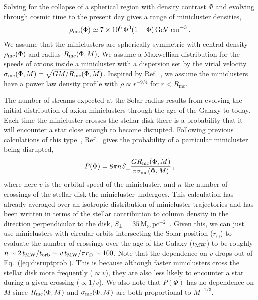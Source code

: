 Solving for the collapse of a spherical region with density contrast $\Phi$ and evolving through cosmic time to the present day gives a range of minicluster densities, 
\begin{equation}
\rho_{\rm mc}(\Phi) \simeq 7 \times 10^6 \, \Phi^3 (1+\Phi) \, \textrm{GeV cm}^{-3} \, .
\end{equation}
We assume that the miniclusters are spherically symmetric with central density $\rho_{\rm mc}(\Phi)$ and radius $R_{\rm mc}(\Phi,M)$. We assume a Maxwellian distribution for the speeds of axions inside a minicluster with a dispersion set by the virial velocity $\sigma_{\rm mc}(\Phi,M) = \sqrt{G M/R_{\rm mc}(\Phi,M)}$. Inspired by Ref.~\cite{Zurek:2006sy}, we assume the miniclusters have a power law density profile with $\rho \propto r^{-9/4}$ for $r<R_\textrm{mc}$. 

The number of streams expected at the Solar radius results from evolving the initial distribution of axion miniclusters through the age of the Galaxy to today. Each time the minicluster crosses the stellar disk there is a probability that it will encounter a star close enough to become disrupted. Following previous calculations of this type~\cite{Goerdt:2006hp,Schneider:2010jr}, Ref.~\cite{Tinyakov:2015cgg} gives the probability of a particular minicluster being disrupted,
\begin{equation}\label{eq:disruptprob}
P(\Phi) = 8\pi n S_{\perp} \frac{G R_{\rm mc}(\Phi,M)}{v \sigma_{\rm mc}(\Phi,M)} \,,
\end{equation}
where here $v$ is the orbital speed of the minicluster, and $n$ the number of crossings of the stellar disk the minicluster undergoes. This calculation has already averaged over an isotropic distribution of minicluster trajectories and has been written in terms of the stellar contribution to column density in the direction perpendicular to the disk, $S_{\perp} = 35 \,\textrm{M}_\odot\, \textrm{pc}^{-2}$~\cite{Kuijken:1989hu}. Given this, we can just use miniclusters with circular orbits intersecting the Solar position ($r_\odot$) to evaluate the number of crossings over the age of the Galaxy ($t_{\rm MW}$) to be roughly $n \sim 2 \, t_{\rm MW}/t_{\rm orb} \sim v \,t_{\rm MW} / \pi r_\odot \sim 100$. Note that the dependence on $v$ drops out of Eq.~(\ref{eq:disruptprob}). This is because although faster miniclusters cross the stellar disk more frequently ($\propto v$), they are also less likely to encounter a star during a given crossing ($\propto 1/v$). We also note that $P(\Phi)$ has no dependence on $M$ since $R_{\rm mc}(\Phi,M)$ and $\sigma_{\rm mc}(\Phi,M)$ are both proportional to $M^{-1/3}$.
 
